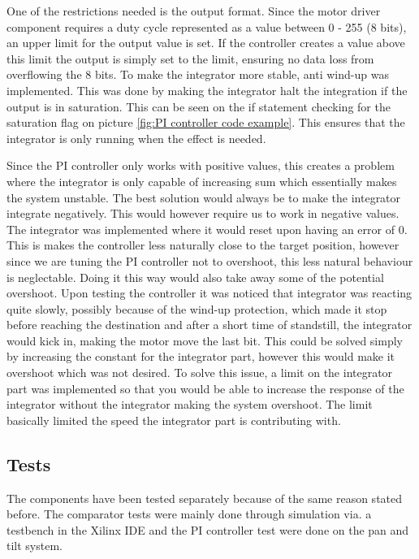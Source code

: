 One of the restrictions needed is the output format. Since the motor driver component requires a duty cycle represented as a value between 0 - 255 (8 bits), an upper limit for the output value is set. If the controller creates a value above this limit the output is simply set to the limit, ensuring no data loss from overflowing the 8 bits.
To make the integrator more stable, anti wind-up was implemented. This was done by making the integrator halt the integration if the output is in saturation. This can be seen on the if statement checking for the saturation flag on picture \ref{fig:PI controller code example}. This ensures that the integrator is only running when the effect is needed.

Since the PI controller only works with positive values, this creates a problem where the integrator is only capable of increasing sum which essentially makes the system unstable. The best solution would always be to make the integrator integrate negatively. This would however require us to work in negative values. The integrator was implemented where it would reset upon having an error of 0. This is makes the controller less naturally close to the target position, however since we are tuning the PI controller not to overshoot, this less natural behaviour is neglectable. Doing it this way would also take away some of the potential overshoot.
Upon testing the controller it was noticed that integrator was reacting quite slowly, possibly because of the wind-up protection, which made it stop before reaching the destination and after a short time of standstill, the integrator would kick in, making the motor move the last bit. This could be solved simply by increasing the constant for the integrator part, however this would make it overshoot which was not desired. To solve this issue, a limit on the integrator part was implemented so that you would be able to increase the response of the integrator without the integrator making the system overshoot. The limit basically limited the speed the integrator part is contributing with.


\subsection{Tests}

The components have been tested separately because of the same reason stated before. The comparator tests were mainly done through simulation via. a testbench in the Xilinx IDE and the PI controller test were done on the pan and tilt system.


